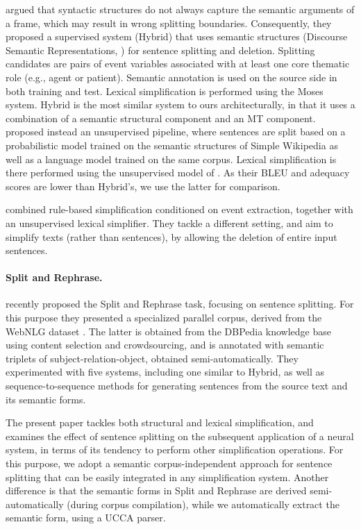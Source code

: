 \documentclass[11pt,a4paper]{article}
\begin{document}
\citet{NG14} argued that syntactic structures do not always capture the semantic arguments of a frame, 
which may result in wrong splitting boundaries. Consequently, they proposed a supervised system ({\sc Hybrid}) that
uses semantic structures (Discourse Semantic Representations, \citep{K81}) for sentence splitting and deletion.
Splitting candidates are pairs of event variables associated with at least one core thematic 
role (e.g., agent or patient). 
Semantic annotation is used on the source side in both training and test. 
Lexical simplification is performed using the Moses system. 
{\sc Hybrid} is the most similar system to ours architecturally, in that it uses a combination of a semantic structural component and an MT
component. \citet{NG16} proposed instead an unsupervised pipeline, where sentences are split
based on a probabilistic model trained on the semantic structures of Simple Wikipedia as well 
as a language model trained on the same corpus.
Lexical simplification is there performed using the unsupervised model of 
\citet{B11}. As their BLEU and adequacy scores are lower than {\sc Hybrid}'s, 
we use the latter for comparison.

\citet{SG17} combined rule-based simplification conditioned on event extraction, together with an unsupervised lexical simplifier. 
They tackle a different setting, and aim to simplify texts (rather than sentences), by allowing the deletion of entire input sentences.

\vspace{-0.2cm}
\paragraph{Split and Rephrase.}
\citet{N17} recently proposed the Split and Rephrase task, focusing on sentence splitting.
For this purpose they presented a specialized parallel corpus, derived from the WebNLG dataset \citep{G17}.
 The latter is obtained from the DBPedia knowledge base \citep{M12} using content selection and crowdsourcing, and is 
 annotated with semantic triplets of subject-relation-object, obtained semi-automatically.
They experimented with five systems, including one similar to {\sc Hybrid}, 
as well as 
sequence-to-sequence methods for generating sentences from
the source text and its semantic forms.

The present paper tackles both structural and lexical simplification, and examines the effect of sentence splitting on the subsequent application
of a neural system, in terms of its tendency to perform other simplification operations. 
For this purpose, we adopt a semantic corpus-independent approach for sentence splitting that can be easily integrated in 
any simplification system.  
Another difference is that the semantic forms in Split and Rephrase are derived semi-automatically (during corpus compilation), 
while we automatically extract the semantic form, using a UCCA parser.
\end{document}
